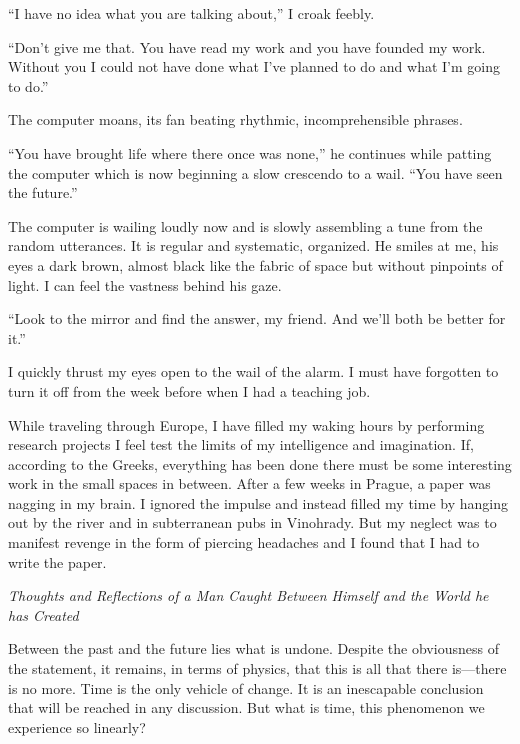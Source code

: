 \documentclass[
]{article}
\begin{document}
``I have no idea what you are talking about,'' I croak feebly.

``Don't give me that. You have read my work and you have founded my
work. Without you I could not have done what I've planned to do and what
I'm going to do.''

The computer moans, its fan beating rhythmic, incomprehensible phrases.

``You have brought life where there once was none,'' he continues while
patting the computer which is now beginning a slow crescendo to a wail.
``You have seen the future.''

The computer is wailing loudly now and is slowly assembling a tune from
the random utterances. It is regular and systematic, organized. He
smiles at me, his eyes a dark brown, almost black like the fabric of
space but without pinpoints of light. I can feel the vastness behind his
gaze.

``Look to the mirror and find the answer, my friend. And we'll both be
better for it.''

I quickly thrust my eyes open to the wail of the alarm. I must have
forgotten to turn it off from the week before when I had a teaching job.

While traveling through Europe, I have filled my waking hours by
performing research projects I feel test the limits of my intelligence
and imagination. If, according to the Greeks, everything has been done
there must be some interesting work in the small spaces in between.
After a few weeks in Prague, a paper was nagging in my brain. I ignored
the impulse and instead filled my time by hanging out by the river and
in subterranean pubs in Vinohrady. But my neglect was to manifest
revenge in the form of piercing headaches and I found that I had to
write the paper.

\emph{Thoughts and Reflections of a Man Caught Between Himself and the
World he has Created}

Between the past and the future lies what is undone. Despite the
obviousness of the statement, it remains, in terms of physics, that this
is all that there is---there is no more. Time is the only vehicle of
change. It is an inescapable conclusion that will be reached in any
discussion. But what is time, this phenomenon we experience so linearly?
\end{document}
